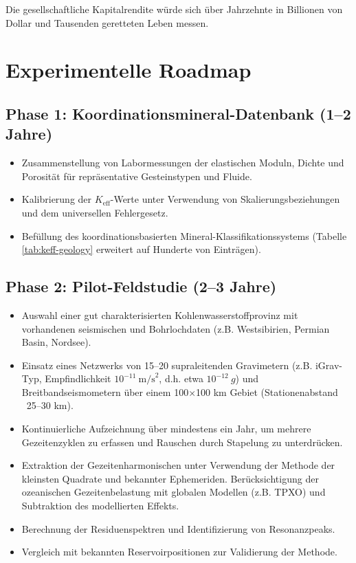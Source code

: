 \documentclass[12pt,a4paper]{article}
\theoremstyle{remark}
\newcommand{\Keff}{K_{\mathrm{eff}}}
\begin{document}
	Die gesellschaftliche Kapitalrendite würde sich über Jahrzehnte in Billionen von Dollar und Tausenden geretteten Leben messen.
	
	\section{Experimentelle Roadmap}
	\label{sec:roadmap}
	
	\subsection{Phase 1: Koordinationsmineral-Datenbank (1–2 Jahre)}
	
	\begin{itemize}
		\item Zusammenstellung von Labormessungen der elastischen Moduln, Dichte und Porosität für repräsentative Gesteinstypen und Fluide.
		\item Kalibrierung der $\Keff$-Werte unter Verwendung von Skalierungsbeziehungen und dem universellen Fehlergesetz.
		\item Befüllung des koordinationsbasierten Mineral-Klassifikationssystems (Tabelle \ref{tab:keff-geology} erweitert auf Hunderte von Einträgen).
	\end{itemize}
	
	\subsection{Phase 2: Pilot-Feldstudie (2–3 Jahre)}
	
	\begin{itemize}
		\item Auswahl einer gut charakterisierten Kohlenwasserstoffprovinz mit vorhandenen seismischen und Bohrlochdaten (z.B. Westsibirien, Permian Basin, Nordsee).
		\item Einsatz eines Netzwerks von 15–20 supraleitenden Gravimetern (z.B. iGrav-Typ, Empfindlichkeit \(10^{-11}\ \text{m/s}^2\), d.h. etwa \(10^{-12}\ g\)) und Breitbandseismometern über einem 100×100 km Gebiet (Stationenabstand ~25–30 km).
		\item Kontinuierliche Aufzeichnung über mindestens ein Jahr, um mehrere Gezeitenzyklen zu erfassen und Rauschen durch Stapelung zu unterdrücken.
		\item Extraktion der Gezeitenharmonischen unter Verwendung der Methode der kleinsten Quadrate und bekannter Ephemeriden. Berücksichtigung der ozeanischen Gezeitenbelastung mit globalen Modellen (z.B. TPXO) und Subtraktion des modellierten Effekts.
		\item Berechnung der Residuenspektren und Identifizierung von Resonanzpeaks.
		\item Vergleich mit bekannten Reservoirpositionen zur Validierung der Methode.
	\end{itemize}
	
\end{document}
